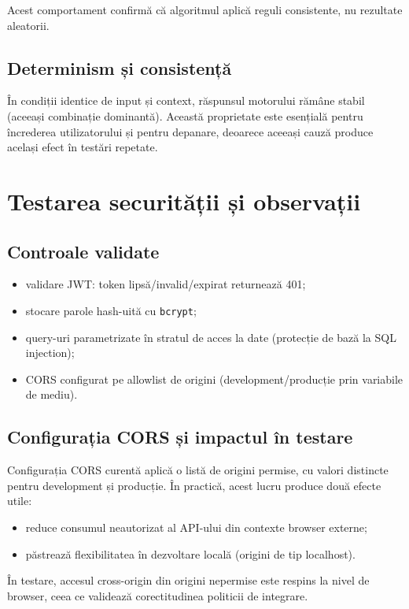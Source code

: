 Acest comportament confirmă că algoritmul aplică reguli consistente, nu rezultate aleatorii.

\subsection{Determinism și consistență}
În condiții identice de input și context, răspunsul motorului rămâne stabil (aceeași combinație dominantă). Această proprietate este esențială pentru încrederea utilizatorului și pentru depanare, deoarece aceeași cauză produce același efect în testări repetate.

\section{Testarea securității și observații}
\subsection{Controale validate}
\begin{itemize}
    \item validare JWT: token lipsă/invalid/expirat returnează 401;
    \item stocare parole hash-uită cu \texttt{bcrypt};
    \item query-uri parametrizate în stratul de acces la date (protecție de bază la SQL injection);
    \item CORS configurat pe allowlist de origini (development/producție prin variabile de mediu).
\end{itemize}

\subsection{Configurația CORS și impactul în testare}
Configurația CORS curentă aplică o listă de origini permise, cu valori distincte pentru development și producție. În practică, acest lucru produce două efecte utile:
\begin{itemize}
    \item reduce consumul neautorizat al API-ului din contexte browser externe;
    \item păstrează flexibilitatea în dezvoltare locală (origini de tip localhost).
\end{itemize}

În testare, accesul cross-origin din origini nepermise este respins la nivel de browser, ceea ce validează corectitudinea politicii de integrare.

